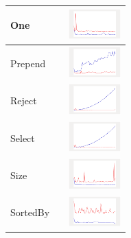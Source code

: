 \begin{longtable}{ m{2.5cm} m{8cm} m{2cm} }
One &

&
\includegraphics[width=2cm]{../graphs/sequence/small/One}
\\\hline

Prepend &

&
\includegraphics[width=2cm]{../graphs/sequence/small/Prepend}
\\\hline

Reject &

&
\includegraphics[width=2cm]{../graphs/sequence/small/Reject}
\\\hline

Select &

&
\includegraphics[width=2cm]{../graphs/sequence/small/Select}
\\\hline

Size &

&
\includegraphics[width=2cm]{../graphs/sequence/small/Size}
\\\hline

SortedBy &

&
\includegraphics[width=2cm]{../graphs/sequence/small/sortedBy}
\\\hline


\end{longtable}
